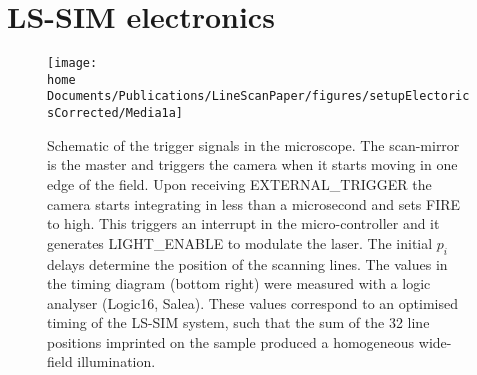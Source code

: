 \chapter{LS-SIM electronics\label{app:LSSIM electronics}}
%
\begin{figure}[!hbt]
	\centering
	\newcommand{\wf}{.8\textwidth}
	\texttt{[image: \\home Documents/Publications/LineScanPaper/figures/setupElectoricsCorrected/Media1a]}
	\caption{Schematic of the trigger signals in the microscope. The scan-mirror is the master and triggers the camera when it starts moving in one edge of the field. Upon receiving {\sf EXTERNAL\_TRIGGER} the camera starts integrating in less than a microsecond and sets {\sf FIRE} to high. This triggers an interrupt in the micro-controller and it generates {\sf LIGHT\_ENABLE} to modulate the laser. The initial $p_i$ delays determine the position of the scanning lines.
The values in the timing diagram (bottom right) were measured with a logic analyser (Logic16, Salea). These values correspond to an optimised timing of the LS-SIM system, such that the sum of the 32 line positions imprinted on the sample produced a homogeneous wide-field illumination.} 
\end{figure}

